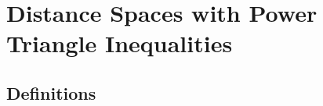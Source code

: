 ﻿%

\chapter{Distance Spaces with Power Triangle Inequalities}
\label{chp:trirel}
\label{chp:pdspace}
\section{Definitions}
\label{sec:pdspace_def}
%

